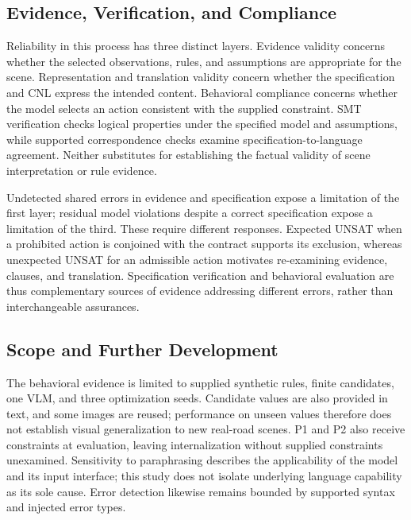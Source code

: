 \documentclass[nolineno]{ieeeaccess}
\begin{document}
\subsection{Evidence, Verification, and Compliance}

Reliability in this process has three distinct layers. Evidence validity concerns whether the selected observations, rules, and assumptions are appropriate for the scene. Representation and translation validity concern whether the specification and CNL express the intended content. Behavioral compliance concerns whether the model selects an action consistent with the supplied constraint. SMT verification checks logical properties under the specified model and assumptions, while supported correspondence checks examine specification-to-language agreement. Neither substitutes for establishing the factual validity of scene interpretation or rule evidence.\par

Undetected shared errors in evidence and specification expose a limitation of the first layer; residual model violations despite a correct specification expose a limitation of the third. These require different responses. Expected UNSAT when a prohibited action is conjoined with the contract supports its exclusion, whereas unexpected UNSAT for an admissible action motivates re-examining evidence, clauses, and translation. Specification verification and behavioral evaluation are thus complementary sources of evidence addressing different errors, rather than interchangeable assurances.\par

\subsection{Scope and Further Development}

The behavioral evidence is limited to supplied synthetic rules, finite candidates, one VLM, and three optimization seeds. Candidate values are also provided in text, and some images are reused; performance on unseen values therefore does not establish visual generalization to new real-road scenes. P1 and P2 also receive constraints at evaluation, leaving internalization without supplied constraints unexamined. Sensitivity to paraphrasing describes the applicability of the model and its input interface; this study does not isolate underlying language capability as its sole cause. Error detection likewise remains bounded by supported syntax and injected error types.\par
\end{document}
